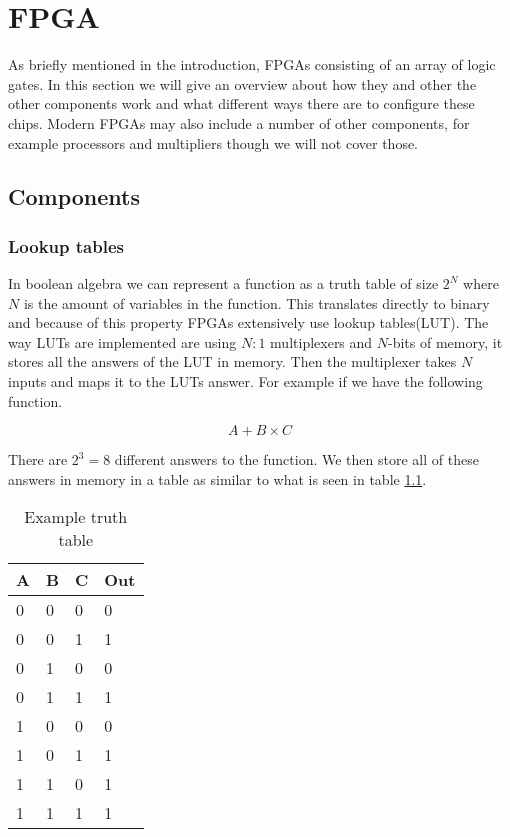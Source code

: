 \chapter{FPGA\label{FPGA}}
As briefly mentioned in the introduction, FPGAs consisting of an array of logic
gates. In this section we will give an overview about how they and other the
other components work and what different ways there are to configure these
chips. Modern FPGAs may also include a number of other components, for example
processors and multipliers though we will not cover those.

\section{Components}
\subsection{Lookup tables}

In boolean algebra we can represent a function as a truth table of size $2^N$
where $N$ is the amount of variables in the function. This translates directly
to binary and because of this property FPGAs extensively use lookup
tables(LUT). The way LUTs are implemented are using $N:1$ multiplexers and
$N$-bits of memory, it stores all the answers of the LUT in memory. Then the
multiplexer takes $N$ inputs and maps it to the LUTs answer. For example if we
have the following function.

$$A + B \times C$$

There are $2^3 = 8$ different answers to the function. We then
store all of these answers in memory in a table as similar to what is seen in
table \ref{tab:example_truth_table}.

\begin{table}[ht]
    \centering
    \begin{tabular}{|l|l|l|l|}
        \hline
        A & B & C & Out \\ \hline
        0 & 0 & 0 & 0   \\ \hline
        0 & 0 & 1 & 1   \\ \hline
        0 & 1 & 0 & 0   \\ \hline
        0 & 1 & 1 & 1   \\ \hline
        1 & 0 & 0 & 0   \\ \hline
        1 & 0 & 1 & 1   \\ \hline
        1 & 1 & 0 & 1   \\ \hline
        1 & 1 & 1 & 1   \\ \hline
    \end{tabular}
    \caption{Example truth table}
    \label{tab:example_truth_table}
\end{table}

